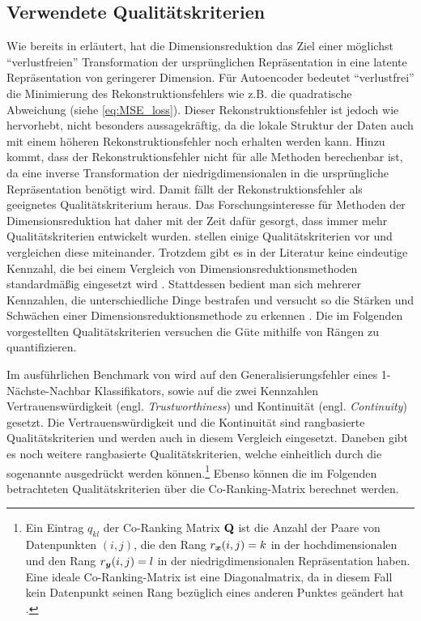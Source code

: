 \subsection{Verwendete Qualitätskriterien}
\label{ch:Vergleich:sec:Methodik:subsec:Qualitaetskriterien}
Wie bereits in  erläutert, hat die Dimensionsreduktion das Ziel einer möglichst \enquote{verlustfreien} Transformation der ursprünglichen Repräsentation in eine latente Repräsentation von geringerer Dimension. Für Autoencoder bedeutet \enquote{verlustfrei} die Minimierung des Rekonstruktionsfehlers wie z.B. die quadratische Abweichung (siehe \eqref{eq:MSE_loss}). Dieser Rekonstruktionsfehler ist jedoch wie \textcite[18]{vanderMaaten.2009} hervorhebt, nicht besonders aussagekräftig, da die lokale Struktur der Daten auch mit einem höheren Rekonstruktionsfehler noch erhalten werden kann. Hinzu kommt, dass der Rekonstruktionsfehler nicht für alle Methoden berechenbar ist, da eine inverse Transformation der niedrigdimensionalen in die ursprüngliche Repräsentation benötigt wird. Damit fällt der Rekonstruktionsfehler als geeignetes Qualitätskriterium heraus. Das Forschungsinteresse für Methoden der Dimensionsreduktion hat daher mit der Zeit dafür gesorgt, dass immer mehr Qualitätskriterien entwickelt wurden. \textcite{Gracia.2014} stellen einige Qualitätskriterien vor und vergleichen diese miteinander. Trotzdem gibt es in der Literatur keine eindeutige Kennzahl, die bei einem Vergleich von Dimensionsreduktionsmethoden standardmäßig eingesetzt wird \parencite[vgl.][1 -- 2]{Lee.2009}. Stattdessen bedient man sich mehrerer Kennzahlen, die
unterschiedliche Dinge bestrafen und versucht so die Stärken und Schwächen einer
Dimensionsreduktionsmethode zu erkennen \parencite[486]{Venna.2001}. Die im Folgenden vorgestellten Qualitätskriterien versuchen die Güte
mithilfe von Rängen zu quantifizieren.

Im ausführlichen Benchmark von \textcite{vanderMaaten.2009} wird auf den Generalisierungsfehler
eines 1-Nächste-Nachbar Klassifikators, sowie auf die zwei Kennzahlen Vertrauenswürdigkeit (engl.
\textit{Trustworthiness}) und Kontinuität (engl. \textit{Continuity}) \parencites{Venna.2001}{Venna.2006} gesetzt. Die Vertrauenswürdigkeit und die Kontinuität sind
rangbasierte Qualitätskriterien und werden auch in diesem Vergleich eingesetzt. Daneben gibt es
noch weitere rangbasierte Qualitätskriterien, welche einheitlich durch die sogenannte
 \parencite[1432]{Lee.2009} ausgedrückt werden können.\footnote{ Ein Eintrag $q_{kl}$ der Co-Ranking
	Matrix $\mathbf{Q}$ ist die Anzahl der Paare von Datenpunkten $(i, j)$, die den Rang $r_{\bm{x}}(i,
		j) = k$ in der hochdimensionalen und den Rang $r_{\bm{y}}(i, j) = l$ in der niedrigdimensionalen
	Repräsentation haben. Eine ideale Co-Ranking-Matrix ist eine Diagonalmatrix, da in diesem Fall kein
	Datenpunkt seinen Rang bezüglich eines anderen Punktes geändert hat \parencite[1432]{Lee.2009}. } Ebenso können die im Folgenden betrachteten Qualitätskriterien über die
Co-Ranking-Matrix berechnet werden.


